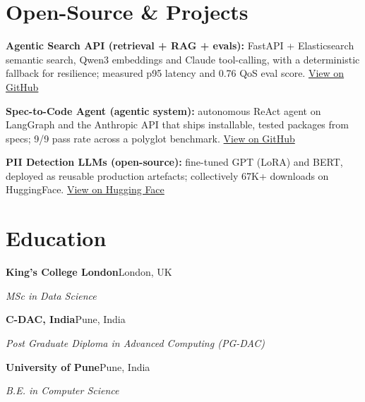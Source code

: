 \documentclass[10pt,a4paper]{article}
\begin{document}
\section{Open-Source \& Projects}
\begin{tight}
  \item \textbf{Agentic Search API (retrieval + RAG + evals):} FastAPI + Elasticsearch semantic search, Qwen3 embeddings and Claude tool-calling, with a deterministic fallback for resilience; measured p95 latency and 0.76 QoS eval score. \href{https://github.com/abhijeetscode/search-agent}{View on GitHub}
  \item \textbf{Spec-to-Code Agent (agentic system):} autonomous ReAct agent on LangGraph and the Anthropic API that ships installable, tested packages from specs; 9/9 pass rate across a polyglot benchmark. \href{https://github.com/abhijeetscode/Spec-to-Code-Agent}{View on GitHub}
  \item \textbf{PII Detection LLMs (open-source):} fine-tuned GPT (LoRA) and BERT, deployed as reusable production artefacts; collectively 67K+ downloads on HuggingFace. \href{https://huggingface.co/ab-ai/pii_model}{View on Hugging Face}
\end{tight}

\section{Education}
{\color{company}\bfseries King's College London}\hfill {\color{muted}London, UK}\par
{\itshape MSc in Data Science}\par\vspace{2pt}
{\color{company}\bfseries C-DAC, India}\hfill {\color{muted}Pune, India}\par
{\itshape Post Graduate Diploma in Advanced Computing (PG-DAC)}\par\vspace{2pt}
{\color{company}\bfseries University of Pune}\hfill {\color{muted}Pune, India}\par
{\itshape B.E. in Computer Science}\par
\end{document}

